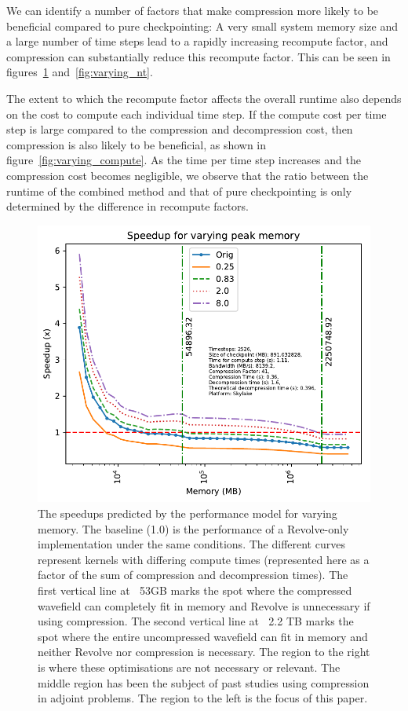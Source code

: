 \documentclass[conference]{IEEEtran}
\begin{document}
We can identify a number of factors that make compression more likely to be
beneficial compared to pure checkpointing: A very small system memory size and a
large number of time steps lead to a rapidly increasing recompute factor, and
compression can substantially reduce this recompute factor. This can be seen in
figures~\ref{fig:varying_memory} and~\ref{fig:varying_nt}.

The extent to which the recompute factor affects the overall runtime also
depends on the cost to compute each individual time step. If the compute cost
per time step is large compared to the compression and decompression cost, then
compression is also likely to be beneficial, as shown in
figure~\ref{fig:varying_compute}. As the time per time step increases and the
compression cost becomes negligible, we observe that the ratio between the runtime
of the combined method and that of pure checkpointing is only determined by the
difference in recompute factors.

\begin{figure}
\begin{center}
\includegraphics[width=\linewidth]{images/varying-memory.pdf}
\end{center}
\caption{The speedups predicted by the performance model for varying
  memory. The baseline
(1.0) is the performance of a Revolve-only implementation under the
same conditions. The different curves represent kernels with differing
compute times (represented here as a factor of the sum of compression
and decompression times). The first vertical line at $~$ 53GB marks the
spot where the compressed wavefield can completely fit in memory and
Revolve is unnecessary if using compression. The second vertical line
at $~$ 2.2 TB marks the spot where the entire uncompressed wavefield can
fit in memory and neither Revolve nor compression is necessary. The
region to the right is where these optimisations are not necessary or
relevant. The middle region has been the subject of past studies using
compression in adjoint problems. The region to the left is the focus
of this paper.}
\label{fig:varying_memory}
\end{figure}
\end{document}
